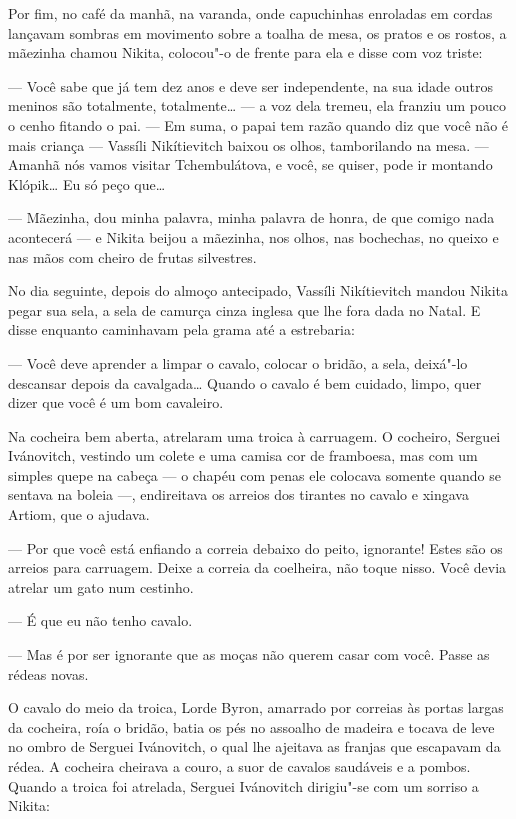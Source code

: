 Por fim, no café da manhã, na varanda, onde capuchinhas enroladas em
cordas lançavam sombras em movimento sobre a toalha de mesa, os pratos e
os rostos, a mãezinha chamou Nikita, colocou"-o de frente para ela e
disse com voz triste:

--- Você sabe que já tem dez anos e deve ser independente, na sua idade
outros meninos são totalmente, totalmente\ldots{} --- a voz dela tremeu, ela
franziu um pouco o cenho fitando o pai. --- Em suma, o papai tem razão
quando diz que você não é mais criança --- Vassíli Nikítievitch baixou
os olhos, tamborilando na mesa. --- Amanhã nós vamos visitar
Tchembulátova, e você, se quiser, pode ir montando Klópik\ldots{} Eu só peço
que\ldots{}

--- Mãezinha, dou minha palavra, minha palavra de honra, de que comigo
nada acontecerá --- e Nikita beijou a mãezinha, nos olhos, nas
bochechas, no queixo e nas mãos com cheiro de frutas silvestres.

No dia seguinte, depois do almoço antecipado, Vassíli Nikítievitch
mandou Nikita pegar sua sela, a sela de camurça cinza inglesa que lhe
fora dada no Natal. E disse enquanto caminhavam pela grama até a
estrebaria:

--- Você deve aprender a limpar o cavalo, colocar o bridão, a sela,
deixá"-lo descansar depois da cavalgada\ldots{} Quando o cavalo é bem cuidado,
limpo, quer dizer que você é um bom cavaleiro.

Na cocheira bem aberta, atrelaram uma troica à carruagem. O cocheiro,
Serguei Ivánovitch, vestindo um colete e uma camisa cor de framboesa,
mas com um simples quepe na cabeça --- o chapéu com penas ele colocava
somente quando se sentava na boleia ---, endireitava os arreios dos
tirantes no cavalo e xingava Artiom, que o ajudava.

--- Por que você está enfiando a correia debaixo do peito, ignorante!
Estes são os arreios para carruagem. Deixe a correia da coelheira, não
toque nisso. Você devia atrelar um gato num cestinho.

--- É que eu não tenho cavalo.

--- Mas é por ser ignorante que as moças não querem casar com você.
Passe as rédeas novas.

O cavalo do meio da troica, Lorde Byron, amarrado por correias às portas
largas da cocheira, roía o bridão, batia os pés no assoalho de madeira e
tocava de leve no ombro de Serguei Ivánovitch, o qual lhe ajeitava as
franjas que escapavam da rédea. A cocheira cheirava a couro, a suor de
cavalos saudáveis e a pombos. Quando a troica foi atrelada, Serguei
Ivánovitch dirigiu"-se com um sorriso a Nikita:

